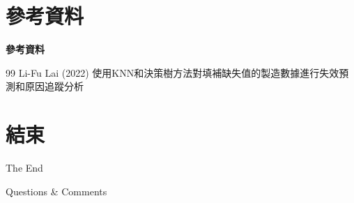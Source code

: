 \documentclass[12pt,aspectratio=43]{beamer}
\begin{document}
\section{參考資料}

\begin{frame}{\textbf{參考資料}}
\linespread{1.5}

\footnotesize

  \begin{thebibliography}{99} 
      Li-Fu Lai (2022) %
      \newblock 使用KNN和決策樹方法對填補缺失值的製造數據進行失效預測和原因追蹤分析 %
  \end{thebibliography}
\end{frame}

\section*{結束}

\begin{frame}[plain] %
	\begin{center}
		{\Huge The End}
		\bigskip\bigskip 

		{\LARGE Questions  \&  Comments}
	\end{center}
\end{frame}
\end{document}
